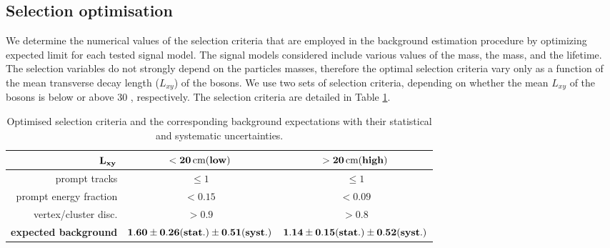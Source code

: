 \subsection{Selection optimisation}
\label{subsec:cutvalues}
We determine the numerical values of the selection criteria that are employed in the background estimation procedure 
by optimizing expected limit for each tested signal model.
The signal models considered include various values of the \Higgs mass, the \X mass, and the \X lifetime.
The selection variables
do not strongly depend on the particles masses, therefore the optimal selection criteria
vary only as a function of the
mean transverse decay length ($L_{xy}$)
of the \X bosons. We use two sets of selection criteria,
depending on whether the mean
$L_{xy}$ of the \X bosons is below or above 30 \cm, respectively. The selection criteria are
detailed in Table \ref{tab:background}.

\begin{table}[htbp]
\centering
\begin{tabular}{r|c|c}
$\bf L_{xy}$ &\bf  $\bf <20\,\text{cm} (low)$ & \bf  $\bf >20\,\text{cm} (high)$ \\
\hline
prompt tracks & $\leq1$ & $\leq1$ \\
prompt energy fraction & $<0.15$ & $<0.09$ \\
vertex/cluster disc. & $>0.9$ & $>0.8$  \\
\hline
\bf expected background & $\bf 1.60\pm0.26(stat.)\pm0.51(syst.)$ & $\bf 1.14\pm0.15(stat.)\pm0.52(syst.)$ \\
\end{tabular}
\caption{Optimised selection criteria and the corresponding background expectations with their statistical and systematic uncertainties.\label{tab:background}}
\end{table}

